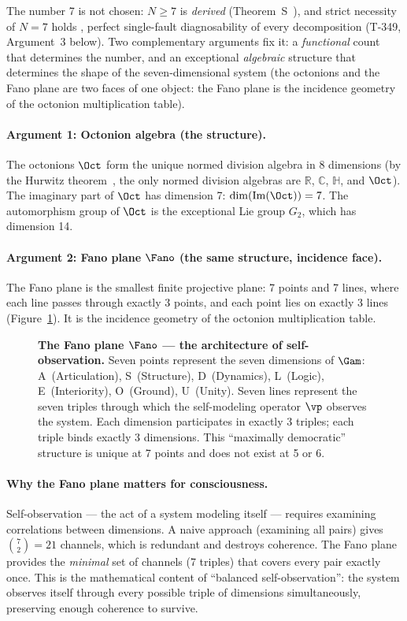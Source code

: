 The number 7 is not chosen: $N \geq 7$ is \emph{derived} (Theorem~S~), and
strict necessity of $N = 7$ holds , perfect single-fault
diagnosability of every decomposition (T-349, Argument~3 below). Two complementary
arguments fix it: a \emph{functional} count that determines the number, and an
exceptional \emph{algebraic} structure that determines the shape of the
seven-dimensional system (the octonions and the Fano plane are two faces of
one object: the Fano plane is the incidence geometry of the octonion
multiplication table).

\paragraph{Argument 1: Octonion algebra (the structure).}
The octonions $\Oct$ form the unique normed division algebra in 8 dimensions (by the
Hurwitz theorem~\cite{hurwitz1898}, the only normed division algebras are $\mathbb{R}$,
$\mathbb{C}$, $\mathbb{H}$, and $\Oct$). The imaginary part of $\Oct$ has dimension 7:
$\dim(\mathrm{Im}(\Oct)) = 7$. The automorphism group of $\Oct$ is the exceptional
Lie group $G_2$, which has dimension 14.

\paragraph{Argument 2: Fano plane $\Fano$ (the same structure, incidence face).}
The Fano plane is the smallest finite projective plane: 7 points and 7 lines,
where each line passes through exactly 3 points, and each point lies on
exactly 3 lines (Figure~\ref{fig:fano}). It is the incidence geometry of
the octonion multiplication table.

\begin{figure}[H]
\centering

\caption{\textbf{The Fano plane $\Fano$ --- the architecture of self-observation.}
Seven points represent the seven dimensions of $\Gam$: A~(Articulation), S~(Structure),
D~(Dynamics), L~(Logic), E~(Interiority), O~(Ground), U~(Unity). Seven lines represent
the seven triples through which the self-modeling operator $\vp$ observes the system.
Each dimension participates in exactly 3 triples; each triple binds exactly 3 dimensions.
This ``maximally democratic'' structure is unique at 7 points and does not exist at 5 or 6.}
\label{fig:fano}
\end{figure}

\paragraph{Why the Fano plane matters for consciousness.}
Self-observation --- the act of a system modeling itself --- requires examining correlations
between dimensions. A naive approach (examining all pairs) gives $\binom{7}{2} = 21$
channels, which is redundant and destroys coherence. The Fano plane provides the
\emph{minimal} set of channels (7 triples) that covers every pair exactly once. This is
the mathematical content of ``balanced self-observation'': the system observes itself
through every possible triple of dimensions simultaneously, preserving enough coherence
to survive.

